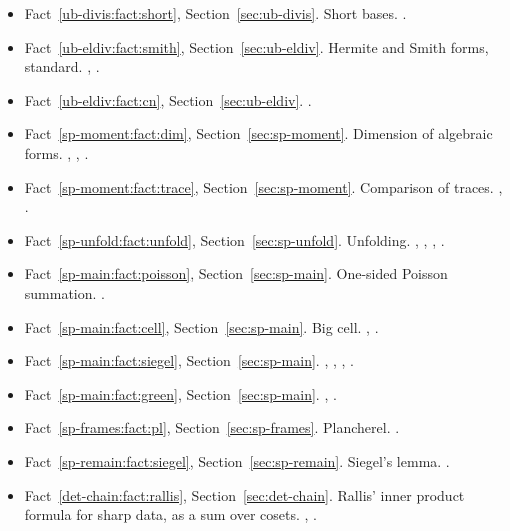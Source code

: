 \begin{itemize}[leftmargin=2em,itemsep=1pt]
\item Fact~\ref{ub-divis:fact:short}, Section~\ref{sec:ub-divis}. Short bases. .
\item Fact~\ref{ub-eldiv:fact:smith}, Section~\ref{sec:ub-eldiv}. Hermite and Smith forms, standard. , .
\item Fact~\ref{ub-eldiv:fact:cn}, Section~\ref{sec:ub-eldiv}. .
\item Fact~\ref{sp-moment:fact:dim}, Section~\ref{sec:sp-moment}. Dimension of algebraic forms. , , .
\item Fact~\ref{sp-moment:fact:trace}, Section~\ref{sec:sp-moment}. Comparison of traces. , .
\item Fact~\ref{sp-unfold:fact:unfold}, Section~\ref{sec:sp-unfold}. Unfolding. , , , .
\item Fact~\ref{sp-main:fact:poisson}, Section~\ref{sec:sp-main}. One-sided Poisson summation. .
\item Fact~\ref{sp-main:fact:cell}, Section~\ref{sec:sp-main}. Big cell. , .
\item Fact~\ref{sp-main:fact:siegel}, Section~\ref{sec:sp-main}. , , , .
\item Fact~\ref{sp-main:fact:green}, Section~\ref{sec:sp-main}. , .
\item Fact~\ref{sp-frames:fact:pl}, Section~\ref{sec:sp-frames}. Plancherel. .
\item Fact~\ref{sp-remain:fact:siegel}, Section~\ref{sec:sp-remain}. Siegel's lemma. .
\item Fact~\ref{det-chain:fact:rallis}, Section~\ref{sec:det-chain}. Rallis' inner product formula for sharp data, as a sum over cosets. , .

\end{itemize}
